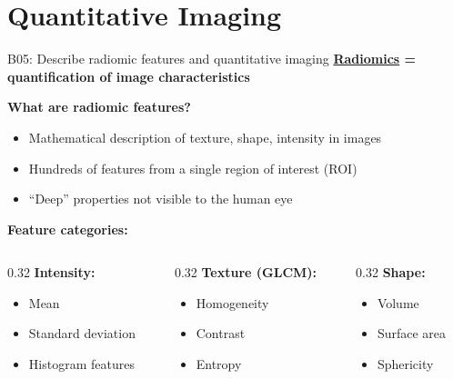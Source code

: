 \documentclass[aspectratio=169, 10pt]{beamer}
\begin{document}
\section{Quantitative Imaging}

\begin{frame}{B05: Describe radiomic features and quantitative imaging}
    \textbf{\href{https://pyradiomics.readthedocs.io/}{Radiomics} = quantification of image characteristics}
    
    \vspace{0.3cm}
    \textbf{What are radiomic features?}
    \begin{itemize}
        \item Mathematical description of texture, shape, intensity in images
        \item Hundreds of features from a single region of interest (ROI)
        \item ``Deep'' properties not visible to the human eye
    \end{itemize}
    
    \vspace{0.3cm}
    \textbf{Feature categories:}
    \begin{columns}[T]
        \begin{column}{0.32\textwidth}
            \textbf{Intensity:}
            \begin{itemize}
                \item Mean
                \item Standard deviation
                \item Histogram features
            \end{itemize}
        \end{column}
        \begin{column}{0.32\textwidth}
            \textbf{Texture (GLCM):}
            \begin{itemize}
                \item Homogeneity
                \item Contrast
                \item Entropy
            \end{itemize}
        \end{column}
        \begin{column}{0.32\textwidth}
            \textbf{Shape:}
            \begin{itemize}
                \item Volume
                \item Surface area
                \item Sphericity
            \end{itemize}
        \end{column}
    \end{columns}
    

\end{frame}
\end{document}
